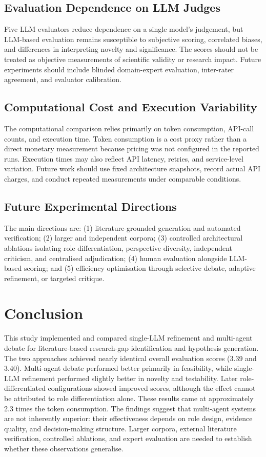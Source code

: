 \documentclass[sigconf,review,anonymous=false]{acmart}
\begin{document}
\subsection{Evaluation Dependence on LLM Judges}
Five LLM evaluators reduce dependence on a single model's judgement, but LLM-based evaluation remains susceptible to subjective scoring, correlated biases, and differences in interpreting novelty and significance. The scores should not be treated as objective measurements of scientific validity or research impact. Future experiments should include blinded domain-expert evaluation, inter-rater agreement, and evaluator calibration.

\subsection{Computational Cost and Execution Variability}
The computational comparison relies primarily on token consumption, API-call counts, and execution time. Token consumption is a cost proxy rather than a direct monetary measurement because pricing was not configured in the reported runs. Execution times may also reflect API latency, retries, and service-level variation. Future work should use fixed architecture snapshots, record actual API charges, and conduct repeated measurements under comparable conditions.

\subsection{Future Experimental Directions}
The main directions are: (1) literature-grounded generation and automated verification; (2) larger and independent corpora; (3) controlled architectural ablations isolating role differentiation, perspective diversity, independent criticism, and centralised adjudication; (4) human evaluation alongside LLM-based scoring; and (5) efficiency optimisation through selective debate, adaptive refinement, or targeted critique.

\section{Conclusion}
This study implemented and compared single-LLM refinement and multi-agent debate for literature-based research-gap identification and hypothesis generation. The two approaches achieved nearly identical overall evaluation scores (3.39 and 3.40). Multi-agent debate performed better primarily in feasibility, while single-LLM refinement performed slightly better in novelty and testability. Later role-differentiated configurations showed improved scores, although the effect cannot be attributed to role differentiation alone. These results came at approximately 2.3 times the token consumption. The findings suggest that multi-agent systems are not inherently superior: their effectiveness depends on role design, evidence quality, and decision-making structure. Larger corpora, external literature verification, controlled ablations, and expert evaluation are needed to establish whether these observations generalise.
\end{document}
